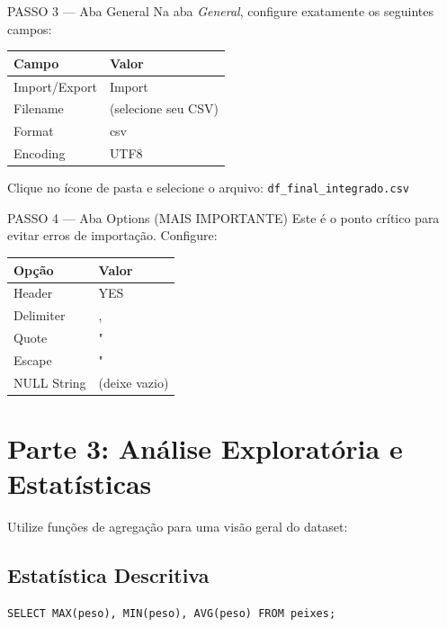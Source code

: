 \documentclass[12pt]{article}
\begin{document}
\begin{block}{PASSO 3 --- Aba General}
Na aba \textit{General}, configure exatamente os seguintes campos:

\vspace{0.2cm}
\centering
\begin{tabular}{|l|l|}
\hline
\textbf{Campo} & \textbf{Valor} \\ \hline
Import/Export & Import \\ \hline
Filename & (selecione seu CSV) \\ \hline
Format & csv \\ \hline
Encoding & UTF8 \\ \hline
\end{tabular}
\vspace{0.2cm}

\flushleft
Clique no ícone de pasta e selecione o arquivo: \texttt{df\_final\_integrado.csv}
\end{block}

\begin{block}{PASSO 4 --- Aba Options (MAIS IMPORTANTE)}
Este é o ponto crítico para evitar erros de importação. Configure:

\vspace{0.2cm}
\centering
\begin{tabular}{|l|l|}
\hline
\textbf{Opção} & \textbf{Valor} \\ \hline
Header & YES \\ \hline
Delimiter & , \\ \hline
Quote & " \\ \hline
Escape & " \\ \hline
NULL String & (deixe vazio) \\ \hline
\end{tabular}
\end{block}

\vspace{0.5cm}

\section*{Parte 3: Análise Exploratória e Estatísticas}
Utilize funções de agregação para uma visão geral do dataset:

\subsection*{Estatística Descritiva}
\begin{lstlisting}
SELECT MAX(peso), MIN(peso), AVG(peso) FROM peixes;
\end{lstlisting}
\end{document}
